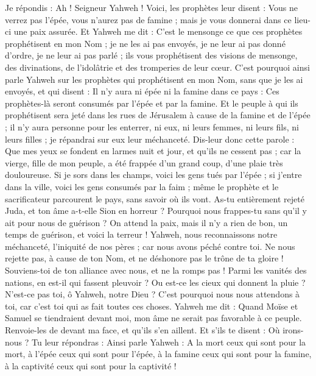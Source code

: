\begin{multicols}{2}
Je répondis : Ah ! Seigneur Yahweh ! Voici, les prophètes leur disent : Vous ne verrez pas l'épée, vous n'aurez pas de famine ; mais je vous donnerai dans ce lieu-ci une paix assurée.
Et Yahweh me dit : C'est le mensonge ce que ces prophètes prophétisent en mon Nom ; je ne les ai pas envoyés, je ne leur ai pas donné d'ordre, je ne leur ai pas parlé ; ils vous prophétisent des visions de mensonge, des divinations, de l'idolâtrie et des tromperies de leur cœur.
C'est pourquoi ainsi parle Yahweh sur les prophètes qui prophétisent en mon Nom, sans que je les ai envoyés, et qui disent : Il n'y aura ni épée ni la famine dans ce pays : Ces prophètes-là seront consumés par l'épée et par la famine.
Et le peuple à qui ils prophétisent sera jeté dans les rues de Jérusalem à cause de la famine et de l'épée ; il n'y aura personne pour les enterrer, ni eux, ni leurs femmes, ni leurs fils, ni leurs filles ; je répandrai sur eux leur méchanceté.
Dis-leur donc cette parole : Que mes yeux se fondent en larmes nuit et jour, et qu'ils ne cessent pas ; car la vierge, fille de mon peuple, a été frappée d'un grand coup, d'une plaie très douloureuse.
Si je sors dans les champs, voici les gens tués par l'épée ; si j'entre dans la ville, voici les gens consumés par la faim ; même le prophète et le sacrificateur parcourent le pays, sans savoir où ils vont.
As-tu entièrement rejeté Juda, et ton âme a-t-elle Sion en horreur ? Pourquoi nous frappes-tu sans qu'il y ait pour nous de guérison ? On attend la paix, mais il n'y a rien de bon, un temps de guérison, et voici la terreur !
Yahweh, nous reconnaissons notre méchanceté, l'iniquité de nos pères ; car nous avons péché contre toi.
Ne nous rejette pas, à cause de ton Nom, et ne déshonore pas le trône de ta gloire ! Souviens-toi de ton alliance avec nous, et ne la romps pas !
Parmi les vanités des nations, en est-il qui fassent pleuvoir ? Ou est-ce les cieux qui donnent la pluie ? N'est-ce pas toi, ô Yahweh, notre Dieu ? C'est pourquoi nous nous attendons à toi, car c'est toi qui as fait toutes ces choses.
\VerseOne{}Yahweh me dit : Quand Moïse et Samuel se tiendraient devant moi, mon âme ne serait pas favorable à ce peuple. Renvoie-les de devant ma face, et qu'ils s'en aillent.
Et s'ils te disent : Où irons-nous ? Tu leur répondras : Ainsi parle Yahweh : A la mort ceux qui sont pour la mort, à l'épée ceux qui sont pour l'épée, à la famine ceux qui sont pour la famine, à la captivité ceux qui sont pour la captivité !

\end{multicols}
